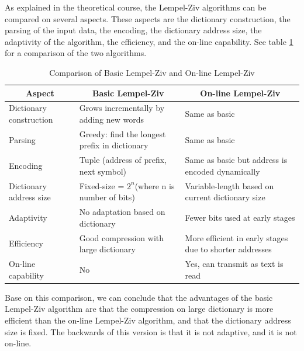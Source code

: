 \documentclass[]{template}
\begin{document}
    As explained in the theoretical course, the Lempel-Ziv algorithms can be compared on several aspects. 
    These aspects are the dictionary construction, the parsing of the input data, 
    the encoding, the dictionary address size, the adaptivity of the algorithm, 
    the efficiency, and the on-line capability.
    See table \ref{tab:basic_vs_online} for a comparison of the two algorithms.\\
    \begin{table}[ht]
        \centering
        \setlength{\tabcolsep}{6pt}
        \begin{tabular}{|p{3cm}|p{5cm}|p{5cm}|}
            \hline
            \multicolumn{1}{|c|}{Aspect} & \multicolumn{1}{c|}{Basic Lempel-Ziv} & \multicolumn{1}{c|}{On-line Lempel-Ziv} \\ \hline
            Dictionary construction      & Grows incrementally by adding new words & Same as basic \\ \hline
            Parsing                      & Greedy: find the longest prefix in dictionary & Same as basic \\ \hline
            Encoding                     & Tuple (address of prefix, next symbol) & Same as basic but address is encoded dynamically \\ \hline
            Dictionary address size      & Fixed-size = $2^n$\newline (where n is number of bits) & Variable-length based on current dictionary size \\ \hline
            Adaptivity                   & No adaptation based on dictionary & Fewer bits used at early stages \\ \hline
            Efficiency                   & Good compression with large dictionary & More efficient in early stages due to shorter addresses \\ \hline
            On-line capability           & No & Yes, can transmit as text is read \\ \hline
        \end{tabular}
        \caption{Comparison of Basic Lempel-Ziv and On-line Lempel-Ziv}\label{tab:basic_vs_online}
    \end{table}

    \noindent
    Base on this comparison, we can conclude that the advantages of the basic Lempel-Ziv algorithm are that the compression on large dictionary is 
    more efficient than the on-line Lempel-Ziv algorithm, and that the dictionary address size is fixed. 
    The backwards of this version is that it is not adaptive, and it is not on-line.\\
\end{document}
